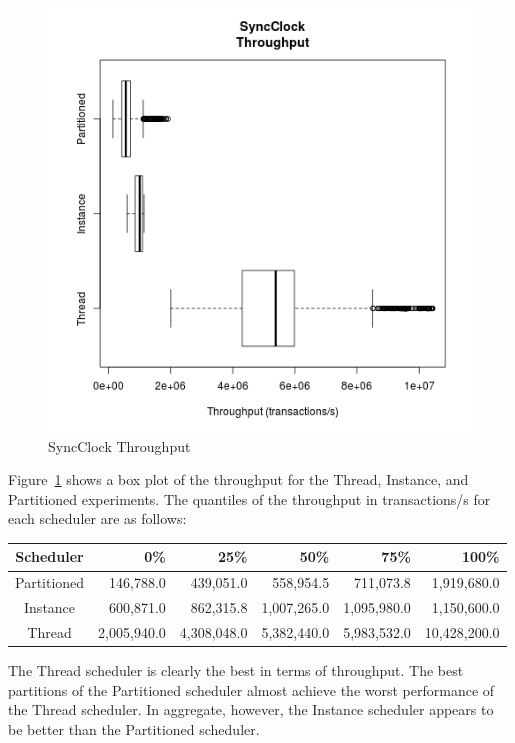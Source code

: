 \begin{figure}[H]
\center
\includegraphics[height=.4\textheight]{sync_throughput_box.png}
\caption{SyncClock Throughput}
\label{sync_throughput_box}
\end{figure}

Figure~\ref{sync_throughput_box} shows a box plot of the throughput for the Thread, Instance, and Partitioned experiments.
The quantiles of the throughput in transactions/s for each scheduler are as follows:
\begin{center}
\begin{tabular}{crrrrr}
Scheduler   &       0\%   &    25\%     &    50\%     &    75\%     &   100\% \\
\hline
Partitioned &   146,788.0 &   439,051.0 &   558,954.5 &   711,073.8 &  1,919,680.0 \\
Instance    &   600,871.0 &   862,315.8 & 1,007,265.0 & 1,095,980.0 &  1,150,600.0 \\
Thread      & 2,005,940.0 & 4,308,048.0 & 5,382,440.0 & 5,983,532.0 & 10,428,200.0 \\
\end{tabular}
\end{center}
The Thread scheduler is clearly the best in terms of throughput.
The best partitions of the Partitioned scheduler almost achieve the worst performance of the Thread scheduler.
In aggregate, however, the Instance scheduler appears to be better than the Partitioned scheduler.

